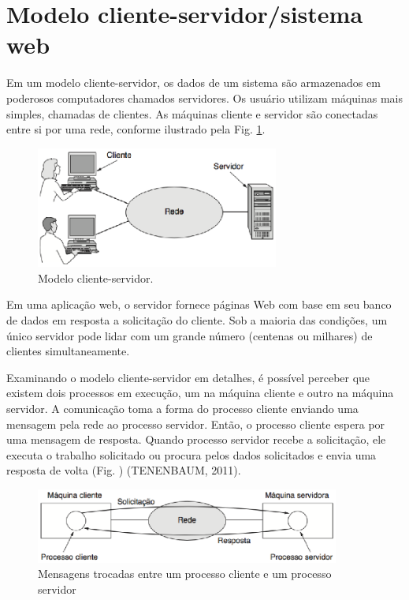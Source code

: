 \section{Modelo cliente-servidor/sistema web}

Em um modelo cliente-servidor, os dados de um sistema são armazenados em poderosos computadores chamados servidores. Os usuário utilizam máquinas mais simples, chamadas de clientes. As máquinas cliente e servidor são conectadas entre si por uma rede, conforme ilustrado pela Fig. \ref{cliente_servidor}.

\begin{figure}[H]
\centering
\includegraphics[width=8cm]{figuras/cliente_servidor.eps}
\caption{Modelo cliente-servidor.}\label{cliente_servidor}
\end{figure}

Em uma aplicação web, o servidor fornece páginas Web com base em seu banco de dados em resposta a solicitação do cliente. Sob a maioria das condições, um único servidor pode lidar com um grande número (centenas ou milhares) de clientes simultaneamente.

Examinando o modelo cliente-servidor em detalhes, é possível perceber que existem dois processos em execução, um na máquina cliente e outro na máquina servidor. A comunicação toma a forma do processo cliente enviando uma mensagem pela rede ao processo servidor. Então, o processo cliente espera por uma mensagem de resposta. Quando processo servidor recebe a solicitação, ele executa o trabalho solicitado ou procura pelos dados solicitados e envia uma resposta de volta (Fig. ) (TENENBAUM, 2011).

\begin{figure}[H]
\centering
\includegraphics[width=10cm]{figuras/cliente_servidor_mensagens.eps}
\caption{Mensagens trocadas entre um processo cliente e um processo servidor}
\end{figure}

